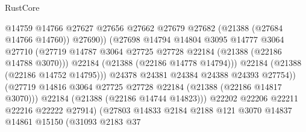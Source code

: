 \begin{lexlean}{RustCore}
\begin{coremodule}
                                        @14759
                                        @14766
                                        @27627
                                        @27656
                                        @27662
                                        @27679
                                        @27682
                                        (@21388 (@27684 @14766 @14760))
                                        @27690))
                                    (@27698
                                      @14794
                                      @14804
                                      @3095
                                      @14777
                                      @3064
                                      @27710
                                      (@27719
                                        @14787
                                        @3064
                                        @27725
                                        @27728
                                        @22184
                                        (@21388 (@22186 @14788 @3070)))
                                      @22184
                                      (@21388 (@22186 @14778 @14794)))
                                    @22184
                                    (@21388 (@22186 @14752 @14795)))
                                  @24378
                                  @24381
                                  @24384
                                  @24388
                                  @24393
                                  @27754))
                              (@27719
                                @14816
                                @3064
                                @27725
                                @27728
                                @22184
                                (@21388 (@22186 @14817 @3070)))
                              @22184
                              (@21388 (@22186 @14744 @14823)))
                            @22202
                            @22206
                            @22211
                            @22216
                            @22222
                            @27914)
                          (@27803
                            @14833
                            @2184
                            @2188
                            @121
                            @3070
                            @14837
                            @14861
                            @15150
                            (@31093
                              @2183
                              @37

\end{coremodule}
\end{lexlean}
